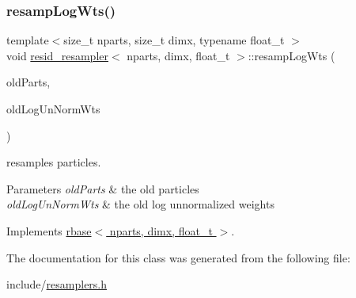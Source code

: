 \subsubsection{\texorpdfstring{resamp\+Log\+Wts()}{resampLogWts()}}
{\footnotesize\ttfamily template$<$size\+\_\+t nparts, size\+\_\+t dimx, typename float\+\_\+t $>$ \\
void \hyperlink{classresid__resampler}{resid\+\_\+resampler}$<$ nparts, dimx, float\+\_\+t $>$\+::resamp\+Log\+Wts (\begin{DoxyParamCaption}\item[{\hyperlink{classrbase_aa12fc826befa6ba0647b5f59ebc396ee}{array\+Vec} \&}]{old\+Parts,  }\item[{\hyperlink{classrbase_a6f76bef853e508cb5b6f546d231b06f5}{array\+Float} \&}]{old\+Log\+Un\+Norm\+Wts }\end{DoxyParamCaption})\hspace{0.3cm}{\ttfamily [virtual]}}



resamples particles. 


\begin{DoxyParams}{Parameters}
{\em old\+Parts} & the old particles \\
\hline
{\em old\+Log\+Un\+Norm\+Wts} & the old log unnormalized weights \\
\hline
\end{DoxyParams}


Implements \hyperlink{classrbase_aff0f6f88fd4656e67f5ebc870f10dd44}{rbase$<$ nparts, dimx, float\+\_\+t $>$}.



The documentation for this class was generated from the following file\+:\begin{DoxyCompactItemize}
\item 
include/\hyperlink{resamplers_8h}{resamplers.\+h}\end{DoxyCompactItemize}
